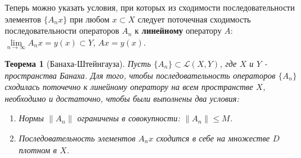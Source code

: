 \documentclass[12pt,a4paper,titlepage, oneside]{book}
\theoremstyle{definition}
\theoremstyle{plain}
\newtheorem*{theorem}{Теорема}
\theoremstyle{remark}
\theoremstyle{remark}
\theoremstyle{remark}
\theoremstyle{plain}
\theoremstyle{plain}
\begin{document}
Теперь можно указать условия, при которых из сходимости последовательности элементов $\lbrace A_n x\rbrace$ при любом $x \subset X$ следует поточечная сходимость последовательности операторов $A_n$ к \textbf{линейному} оператору $A$: $\lim\limits_{n \to \infty}A_n x = y(x) \subset Y$, $Ax=y(x)$.

\begin{theorem}[Банаха-Штейнгауза]
Пусть $\lbrace A_n\rbrace \subset \mathcal{L}(X,Y)$, где $X$ и $Y$ - пространства Банаха. Для того, чтобы последовательность операторов $\lbrace A_n\rbrace$ сходилась поточечно к линейному оператору на всем пространстве $X$, необходимо и достаточно, чтобы были выполнены два условия:

\begin{enumerate}
\item Нормы $\lVert A_n\rVert$ ограничены в совокупности: $\lVert A_n\rVert \le M$.
\item Последовательность элементов $A_n x$ сходится в себе на множестве $D$ плотном в $X$.
\end{enumerate}
\end{theorem}
\end{document}
